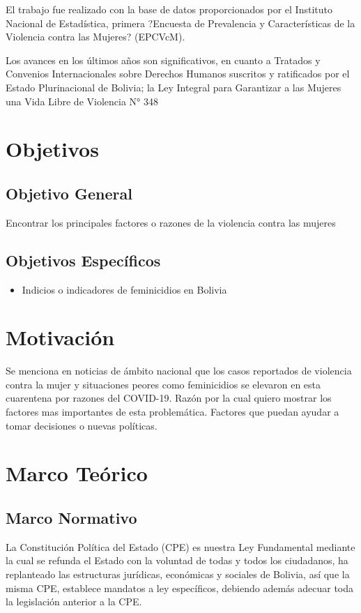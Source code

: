 \documentclass[11pt,letter]{article}
\begin{document}
El trabajo fue realizado con la base de datos proporcionados por el Instituto Nacional de Estadística, primera ?Encuesta de Prevalencia y Características de la Violencia contra las Mujeres? (EPCVcM).

Los avances en los últimos años son significativos, en cuanto a Tratados y Convenios Internacionales sobre Derechos Humanos suscritos y ratificados por el Estado Plurinacional de Bolivia; la Ley Integral para Garantizar a las Mujeres una Vida Libre de Violencia N° 348

\section{Objetivos}

\subsection{Objetivo General}
Encontrar los principales factores o razones de la violencia contra las mujeres
\subsection{Objetivos Específicos}
\begin{itemize}
\item Indicios o indicadores de feminicidios en Bolivia 
\end{itemize}

\section{Motivación}
Se menciona en noticias de ámbito nacional que los casos reportados de violencia contra la mujer y situaciones peores como feminicidios se elevaron en esta cuarentena por razones del COVID-19. 
Razón por la cual quiero mostrar los factores mas importantes de esta problemática.
Factores que puedan ayudar a tomar decisiones o nuevas políticas.

\section{Marco Teórico}

\subsection{Marco Normativo}
La Constitución Política del Estado (CPE) es nuestra Ley Fundamental mediante la cual se refunda el Estado con la voluntad de todas y todos los ciudadanos, ha replanteado las estructuras jurídicas, económicas y sociales de Bolivia, así que la misma CPE, establece mandatos a ley
específicos, debiendo además adecuar toda la legislación
anterior a la CPE.\autocite{ley348}
\end{document}
